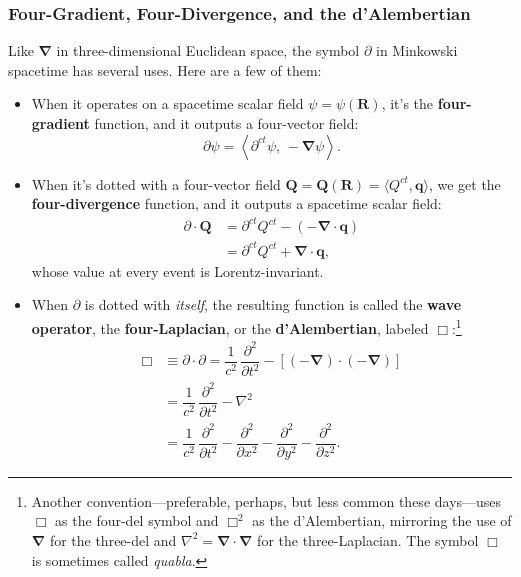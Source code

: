 \documentclass[12pt]{article}
\renewcommand{\vv}[1]{\mathbf{#1}}
\newcommand{\del}{\boldsymbol{\nabla}}
\begin{document}
\subsubsection{Four-Gradient, Four-Divergence, and the d'Alembertian}

Like $\del$ in three-dimensional Euclidean space, the symbol $\partialup$ in Minkowski spacetime has several uses. Here are a few of them:
\begin{itemize}
\item{
When it operates on a spacetime scalar field $\psi = \psi (\vv R)$, it's the \textbf{four-gradient} function, and it outputs a four-vector field:
\begin{equation*}
\partialup \psi = \left \langle \partial^{ct} \psi, \, -\del \psi \right \rangle.
\end{equation*}
}
\item{
When it's dotted with a four-vector field $\vv Q = \vv Q (\vv R) = \langle Q^{ct}, \vv q \rangle$, we get the \textbf{four-divergence} function, and it outputs a spacetime scalar field:
\begin{equation*}
\begin{split}
\partialup \cdot \vv Q &= \partial^{ct} Q^{ct} - \left( - \del \cdot \vv q \right) \\
&= \partial^{ct} Q^{ct} + \del \cdot \vv q ,
\end{split}
\end{equation*}
whose value at every event is Lorentz-invariant.
}
\item{
When $\partialup$ is dotted with \emph{itself}, the resulting function is called the \textbf{wave operator}, the \textbf{four-Laplacian}, or the \textbf{d'Alembertian}, labeled $\Box$:\footnote{Another convention---preferable, perhaps, but less common these days---uses $\Box$ as the four-del symbol and $\Box^2$ as the d'Alembertian, mirroring the use of $\del$ for the three-del and $\nabla ^2 = \del \cdot \del$ for the three-Laplacian. The symbol $\Box$ is sometimes called \emph{quabla}.}
\begin{equation*}
\begin{split}
\Box &\equiv \partialup \cdot \partialup = \dfrac{1}{c^2} \, \dfrac{\partial^2}{\partial t^2} - \left[ \left( - \del \right) \cdot \left( - \del \right) \right] \\
&= \dfrac{1}{c^2} \, \dfrac{\partial^2}{\partial t^2} - \nabla ^2 \\[4pt]
&= \dfrac{1}{c^2} \, \dfrac{\partial^2}{\partial t^2} - \dfrac{\partial^2}{\partial x^2} - \dfrac{\partial^2}{\partial y^2} - \dfrac{\partial^2}{\partial z^2} .
\end{split}
\end{equation*}
}
\end{itemize}
\end{document}
